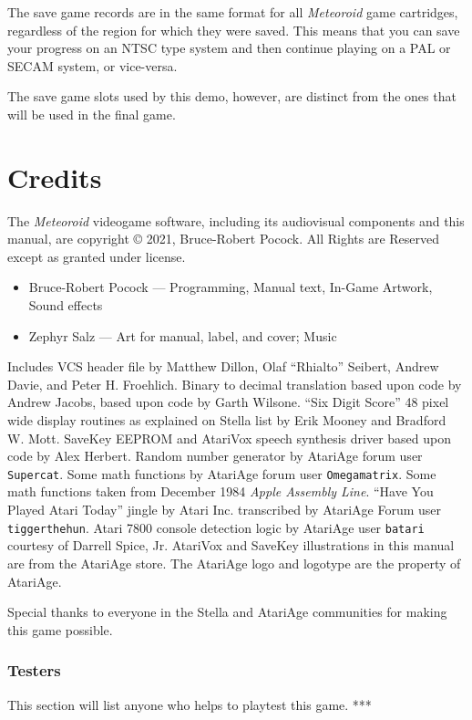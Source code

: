 \documentclass[10pt,twocolumn,openany,article]{memoir}
\begin{document}
The save game records are in the same format for all \textit{Meteoroid} game
cartridges, regardless of the region for which they were saved.  This means
that you can save your progress on an NTSC type system and then continue
playing on a PAL or SECAM system, or vice-versa.

\ifdefined\DEMO

The save  game slots used by  this demo, however, are  distinct from the
ones that will be used in the final game.

\fi

\chapter{Credits}

{\small

  The  \textit{Meteoroid} videogame  software,  including its  audiovisual
components   and  this   manual,   are   copyright  \copyright{}   2021,
Bruce-Robert  Pocock.   All  Rights  are  Reserved   except  as  granted
under license.

\begin{itemize}
\item Bruce-Robert Pocock --- Programming, Manual text, In-Game Artwork,
  Sound effects
\item Zephyr Salz --- Art for manual, label, and cover; Music
\end{itemize}

\bigskip


Includes VCS  header file by  Matthew Dillon, Olaf  ``Rhialto'' Seibert,
Andrew  Davie, and  Peter H.  Froehlich. Binary  to decimal  translation
based upon  code by  Andrew Jacobs,  based upon  code by  Garth Wilsone.
``Six  Digit Score''  48 pixel  wide  display routines  as explained  on
Stella list  by Erik  Mooney and  Bradford W.  Mott. SaveKey  EEPROM and
AtariVox  speech  synthesis driver  based  upon  code by  Alex  Herbert.
Random  number  generator  by  AtariAge  forum  user  \texttt{Supercat}.
Some  math  functions  by AtariAge  forum  user  \texttt{Omega\-matrix}.
Some  math functions  taken  from December  1984 \textit{Apple  Assembly
  Line}.  ``Have  You   Played  Atari  Today''  jingle   by  Atari  Inc.
transcribed by AtariAge Forum user \texttt{tigger\-the\-hun}. Atari 7800
console  detection logic  by AtariAge  user \texttt{batari}  courtesy of
Darrell Spice, Jr. AtariVox and SaveKey illustrations in this manual are
from  the AtariAge  store.  \ifdefined\DEMO\else The  AtariAge logo  and
logotype are the property of AtariAge. \fi

Special thanks  to everyone in  the Stella and AtariAge  communities for
making this game possible.

\subsection{Testers}


This section will list anyone who helps to playtest this game. ***

}
\end{document}
